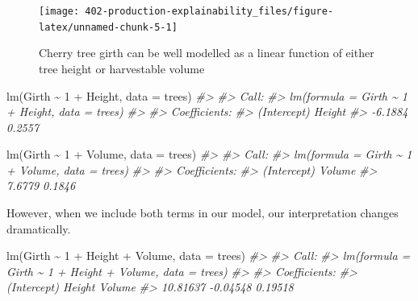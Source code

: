 \documentclass[
  12pt,
]{book}
\newenvironment{Shaded}{\begin{snugshade}}{\end{snugshade}}
\newcommand{\AttributeTok}[1]{\textcolor[rgb]{0.77,0.63,0.00}{#1}}
\newcommand{\CommentTok}[1]{\textcolor[rgb]{0.56,0.35,0.01}{\textit{#1}}}
\newcommand{\DecValTok}[1]{\textcolor[rgb]{0.00,0.00,0.81}{#1}}
\newcommand{\FunctionTok}[1]{\textcolor[rgb]{0.00,0.00,0.00}{#1}}
\newcommand{\NormalTok}[1]{#1}
\newcommand{\SpecialCharTok}[1]{\textcolor[rgb]{0.00,0.00,0.00}{#1}}
\begin{document}
\begin{figure}

{\centering \texttt{[image: 402-production-explainability\_files/figure-latex/unnamed-chunk-5-1]} 

}

\caption{Cherry tree girth can be well modelled as a linear function of either tree height or harvestable volume}\label{fig:unnamed-chunk-5}
\end{figure}

\begin{Shaded}
\begin{Highlighting}[]
\FunctionTok{lm}\NormalTok{(Girth }\SpecialCharTok{\textasciitilde{}} \DecValTok{1} \SpecialCharTok{+}\NormalTok{ Height, }\AttributeTok{data =}\NormalTok{ trees)}
\CommentTok{\#\textgreater{} }
\CommentTok{\#\textgreater{} Call:}
\CommentTok{\#\textgreater{} lm(formula = Girth \textasciitilde{} 1 + Height, data = trees)}
\CommentTok{\#\textgreater{} }
\CommentTok{\#\textgreater{} Coefficients:}
\CommentTok{\#\textgreater{} (Intercept)       Height  }
\CommentTok{\#\textgreater{}     {-}6.1884       0.2557}
\end{Highlighting}
\end{Shaded}

\begin{Shaded}
\begin{Highlighting}[]
\FunctionTok{lm}\NormalTok{(Girth }\SpecialCharTok{\textasciitilde{}} \DecValTok{1} \SpecialCharTok{+}\NormalTok{ Volume, }\AttributeTok{data =}\NormalTok{ trees)}
\CommentTok{\#\textgreater{} }
\CommentTok{\#\textgreater{} Call:}
\CommentTok{\#\textgreater{} lm(formula = Girth \textasciitilde{} 1 + Volume, data = trees)}
\CommentTok{\#\textgreater{} }
\CommentTok{\#\textgreater{} Coefficients:}
\CommentTok{\#\textgreater{} (Intercept)       Volume  }
\CommentTok{\#\textgreater{}      7.6779       0.1846}
\end{Highlighting}
\end{Shaded}

However, when we include both terms in our model, our interpretation changes dramatically.

\begin{Shaded}
\begin{Highlighting}[]
\FunctionTok{lm}\NormalTok{(Girth }\SpecialCharTok{\textasciitilde{}} \DecValTok{1} \SpecialCharTok{+}\NormalTok{ Height }\SpecialCharTok{+}\NormalTok{ Volume, }\AttributeTok{data =}\NormalTok{ trees)}
\CommentTok{\#\textgreater{} }
\CommentTok{\#\textgreater{} Call:}
\CommentTok{\#\textgreater{} lm(formula = Girth \textasciitilde{} 1 + Height + Volume, data = trees)}
\CommentTok{\#\textgreater{} }
\CommentTok{\#\textgreater{} Coefficients:}
\CommentTok{\#\textgreater{} (Intercept)       Height       Volume  }
\CommentTok{\#\textgreater{}    10.81637     {-}0.04548      0.19518}
\end{Highlighting}
\end{Shaded}
\end{document}
